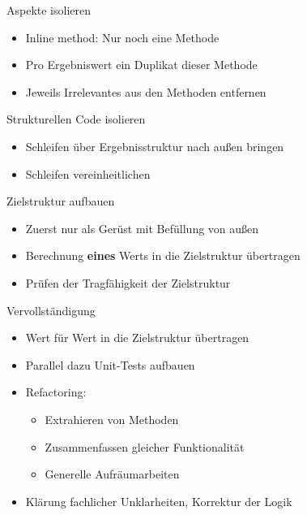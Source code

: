 \begin{frame}[t,fragile]{Aspekte isolieren}
\begin{itemize}
\item Inline method: Nur noch eine Methode
\item Pro Ergebniswert ein Duplikat dieser Methode
\item Jeweils Irrelevantes aus den Methoden entfernen
\end{itemize}
\end{frame}

\begin{frame}[t,fragile]{Strukturellen Code isolieren}
\begin{itemize}
\item Schleifen über Ergebnisstruktur nach außen bringen
\item Schleifen vereinheitlichen
\end{itemize}
\end{frame}

\begin{frame}[t,fragile]{Zielstruktur aufbauen}
\begin{itemize}
\item Zuerst nur als Gerüst mit Befüllung von außen
\item Berechnung \textbf{eines} Werts in die Zielstruktur übertragen
\item Prüfen der Tragfähigkeit der Zielstruktur
\end{itemize}
\end{frame}

\begin{frame}[t,fragile]{Vervollständigung}
\begin{itemize}
\item Wert für Wert in die Zielstruktur übertragen
\item Parallel dazu Unit-Tests aufbauen
\item Refactoring: 
\begin{itemize}
\item Extrahieren von Methoden
\item Zusammenfassen gleicher Funktionalität
\item Generelle Aufräumarbeiten
\end{itemize}
\item Klärung fachlicher Unklarheiten, Korrektur der Logik
\end{itemize}
\end{frame}

